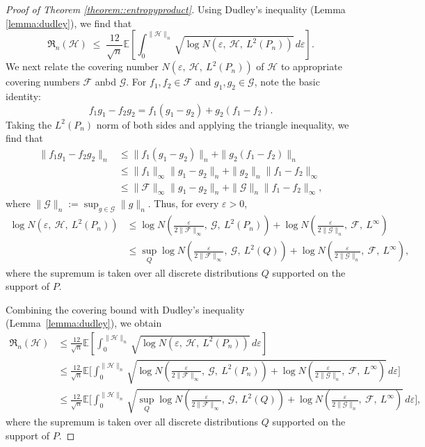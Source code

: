 \documentclass[11pt]{article}
\theoremstyle{plain}
\theoremstyle{definition} %
\begin{document}
 


\begin{proof}[Proof of Theorem \ref{theorem::entropyproduct}]
 
Using Dudley's inequality (Lemma \ref{lemma:dudley}), we find that
\[
\mathfrak{R}_n(\mathcal{H})
\;\le\;
\frac{12}{\sqrt{n}}
\mathbb{E} \left[ \int_{0}^{\|\mathcal{H}\|_{n}}
\sqrt{\log N\left(\varepsilon,\ \mathcal H,\ L^2(P_n)\right)}\, d\varepsilon \right].
\]
We next relate the covering number $N\left(\varepsilon,\ \mathcal H,\ L^2(P_n)\right)$ of $\mathcal{H}$ to appropriate covering numbers  $\mathcal{F}$ anbd $\mathcal{G}$. For $f_1, f_2 \in \mathcal{F}$ and $g_1, g_2 \in \mathcal{G}$, note the basic identity:
$$f_1 g_1 - f_2 g_2 = f_1(g_1 - g_2) + g_2(f_1 - f_2).$$
Taking the $L^2(P_n)$ norm of both sides and applying the triangle inequality, we find that
\begin{align*}
   \|f_1 g_1 - f_2 g_2 \|_{n} & \leq  \|f_1(g_1 - g_2)\|_n + \|g_2(f_1 - f_2)\|_n\\
    & \leq  \|f_1\|_{\infty} \|g_1 - g_2\|_n + \|g_2\|_n \|f_1 - f_2\|_\infty\\
      & \leq  \|\mathcal{F}\|_{\infty} \|g_1 - g_2\|_n + \|\mathcal{G}\|_n \|f_1 - f_2\|_\infty,
\end{align*}
where $\|\mathcal G\|_n := \sup_{g\in\mathcal G}\|g\|_n$.
Thus, for every $\varepsilon>0$,
\begin{align*}
\log N\left(\varepsilon,\ \mathcal H,\ L^2(P_n)\right)
&\le
\log N\left(\frac{\varepsilon}{2\|\mathcal F\|_\infty},\ \mathcal G,\ L^2(P_n)\right)
+
\log N\left(\frac{\varepsilon}{2\|\mathcal G\|_n},\ \mathcal F,\ L^\infty\right)\\
&\le
\sup_Q \log N\left(\frac{\varepsilon}{2\|\mathcal F\|_\infty},\ \mathcal G,\ L^2(Q)\right)
+
\log N\left(\frac{\varepsilon}{2\|\mathcal G\|_n},\ \mathcal F,\ L^\infty\right),
\end{align*}
where the supremum is taken over all discrete distributions $Q$ supported on the support of $P$.

Combining the covering bound with Dudley's inequality (Lemma~\ref{lemma:dudley}), we obtain
\begin{align*}
\mathfrak{R}_n(\mathcal{H})
&\le
\frac{12}{\sqrt{n}}
\mathbb{E}\left[
\int_{0}^{\|\mathcal{H}\|_{n}}
\sqrt{\log N\left(\varepsilon,\ \mathcal H,\ L^2(P_n)\right)}\, d\varepsilon
\right]\\
&\le
\frac{12}{\sqrt{n}}
\mathbb{E}\Biggl[
\int_{0}^{\|\mathcal{H}\|_{n}}
\sqrt{
\log N\left(\frac{\varepsilon}{2\|\mathcal F\|_\infty},\ \mathcal G,\ L^2(P_n)\right)
+
\log N\left(\frac{\varepsilon}{2\|\mathcal G\|_n},\ \mathcal F,\ L^\infty\right)
}\, d\varepsilon
\Biggr]\\
&\le
\frac{12}{\sqrt{n}}
\mathbb{E}\Biggl[
\int_{0}^{\|\mathcal{H}\|_{n}}
\sqrt{
\sup_Q \log N\left(\frac{\varepsilon}{2\|\mathcal F\|_\infty},\ \mathcal G,\ L^2(Q)\right)
+
\log N\left(\frac{\varepsilon}{2\|\mathcal G\|_n},\ \mathcal F,\ L^\infty\right)
}\, d\varepsilon
\Biggr],
\end{align*}
where the supremum is taken over all discrete distributions $Q$ supported on the support of $P$.


\end{proof}
\end{document}
